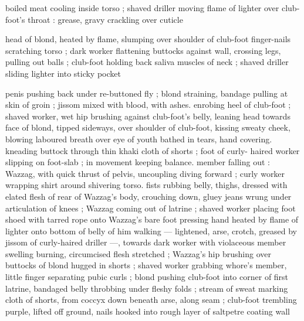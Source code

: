 boiled meat cooling inside torso ; shaved driller moving flame of
lighter over club-foot's throat : grease, gravy crackling over cuticle

head of blond, heated by flame, slumping over shoulder of club-foot
finger-nails scratching torso ; dark worker flattening buttocks against
wall, crossing legs, pulling out balls ; club-foot holding back saliva
muscles of neck ; shaved driller sliding lighter into sticky pocket

penis pushing back under re-buttoned fly ; blond straining, bandage
pulling at skin of groin ; jissom mixed with blood, with ashes.
enrobing heel of club-foot ; shaved worker, wet hip brushing against
club-foot's belly, leaning head towards face of blond, tipped
sideways, over shoulder of club-foot, kissing sweaty cheek, blowing
laboured breath over eye of youth bathed in tears, hand covering.
kneading buttock through thin khaki cloth of shorts ; foot of curly-
haired worker slipping on foot-slab ; in movement keeping balance.
member falling out : Wazzag, with quick thrust of pelvis, uncoupling
diving forward ; curly worker wrapping shirt around shivering torso.
fists rubbing belly, thighs, dressed with elated flesh of rear of
Wazzag's body, crouching down, gluey jeans wrung under
articulation of knees ; Wazzag coming out of latrine ; shaved worker
placing foot shoed with tarred rope onto Wazzag's bare foot
pressing hand heated by flame of lighter onto bottom of belly of him
walking — lightened, arse, crotch, greased by jissom of curly-haired
driller —, towards dark worker with violaceous member swelling
burning, circumcised flesh stretched ; Wazzag's hip brushing over
buttocks of blond hugged in shorts ; shaved worker grabbing
whore’s member, little finger separating pubic curls ; blond pushing
club-foot into corner of first latrine, bandaged belly throbbing under
fleshy folds ; stream of sweat marking cloth of shorts, from coccyx
down beneath arse, along seam ; club-foot trembling purple, lifted
off ground, nails hooked into rough layer of saltpetre coating wall

